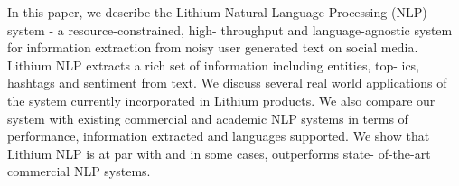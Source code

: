 In this paper, we describe the Lithium Natural Language Processing (NLP) system - a resource-constrained, high- throughput and language-agnostic system for information extraction from noisy user generated text on social media. Lithium NLP extracts a rich set of information including entities, top- ics, hashtags and sentiment from text. We discuss several real world applications of the system currently incorporated in Lithium products. We also compare our system with existing commercial and academic NLP systems in terms of performance, information extracted and languages supported. We show that Lithium NLP is at par with and in some cases, outperforms state- of-the-art commercial NLP systems.
